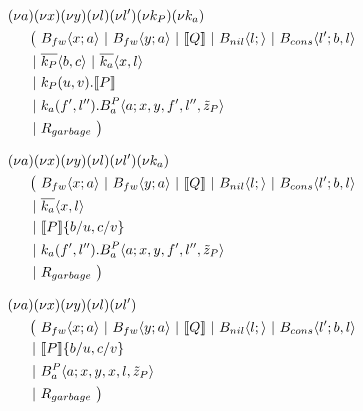 \begin{align*}
  &\anew{a}{\anew{x}{\anew{y}{\anew{l}{\anew{l'}{\anew{k_P}{\anew{k_a}{ \\
    &\hspace{0.5cm}
    \begin{aligned}[t]
      \big(\ &\ains{B_{fw}}{x}{a}
      \apar   \ains{B_{fw}}{y}{a}
      \apar   \encMJtoAP{Q}
      \apar   \ains{B_{nil}}{l}{}
      \apar   \ains{B_{cons}}{l'}{b, l}
      \\
      \apar  &\asnd{k_P}{b,c}
      \apar   \asnd{k_a}{x,l}
      \\
      \apar  &\arcv{k_P}{u,v} . \encMJtoAP{P}
      \\
      \apar  &\arcv{k_a}{f',l''} . \ains{B_a^P}{a}{x, y, f', l'',\tilde{z}_P}
      \\
      \apar  &R_{garbage}
      \ \big)
    \end{aligned}
  }}}}}}}
\end{align*}


\begin{align*}
  &\anew{a}{\anew{x}{\anew{y}{\anew{l}{\anew{l'}{\anew{k_a}{ \\
    &\hspace{0.5cm}
    \begin{aligned}[t]
      \big(\ &\ains{B_{fw}}{x}{a}
      \apar   \ains{B_{fw}}{y}{a}
      \apar   \encMJtoAP{Q}
      \apar   \ains{B_{nil}}{l}{}
      \apar   \ains{B_{cons}}{l'}{b, l}
      \\
      \apar  &\asnd{k_a}{x,l}
      \\
      \apar  &\encMJtoAP{P}\substitution{\subst{b}{u},\subst{c}{v}}
      \\
      \apar  &\arcv{k_a}{f',l''} . \ains{B_a^P}{a}{x, y, f', l'',\tilde{z}_P}
      \\
      \apar  &R_{garbage}
      \ \big)
    \end{aligned}
  }}}}}}
\end{align*}


\begin{align*}
  &\anew{a}{\anew{x}{\anew{y}{\anew{l}{\anew{l'}{ \\
    &\hspace{0.5cm}
    \begin{aligned}[t]
      \big(\ &\ains{B_{fw}}{x}{a}
      \apar   \ains{B_{fw}}{y}{a}
      \apar   \encMJtoAP{Q}
      \apar   \ains{B_{nil}}{l}{}
      \apar   \ains{B_{cons}}{l'}{b, l}
      \\
      \apar  &\encMJtoAP{P}\substitution{\subst{b}{u},\subst{c}{v}}
      \\
      \apar  &\ains{B_a^P}{a}{x, y, x, l,\tilde{z}_P}
      \\
      \apar  &R_{garbage}
      \ \big)
    \end{aligned}
  }}}}}
\end{align*}

